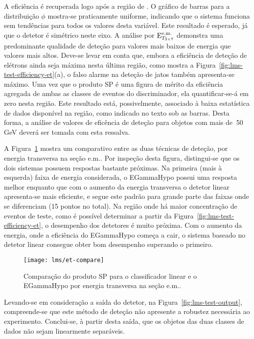 A eficiência é recuperada logo após a região de . O gráfico de
barras para a distribuição $\phi$ mostra-se praticamente uniforme, indicando
que o sistema funciona sem tendências para todos os valores desta
variável. Este resultado é esperado, já que o detetor é simétrico neste
eixo. A análise por $\text{E}^{\text{e.m.}}_{T_{3\times7}}$ demonstra uma predominante qualidade de deteção
para valores mais baixos de energia que valores mais altos. Deve-se levar em
conta que, embora a eficiência de deteção de elétrons ainda seja máxima nesta
última região, como mostra a Figura~\ref{fig:lms-test-efficiency-et}(a), o falso
alarme na deteção de jatos também apresenta-se máximo. Uma vez que o produto
SP é uma figura de mérito da eficiência agregada de ambas as classes de
eventos do discriminador, ela quantificar-se-á em zero nesta região. Este
resultado está, possivelmente, associado à baixa estatística de dados
disponível na região, como indicado no texto sob as barras. Desta forma, a
análise de valores de eficência de deteção para objetos com mais de $~$50 GeV
deverá ser tomada com esta ressalva.

A Figura~\ref{fig:lms-vs-egamma} mostra um comparativo entre as duas técnicas
de deteção, por energia transversa na seção e.m.. Por inspeção desta figura,
distingui-se que os dois sistemas possuem respostas bastante próximas. Na
primeira (mais à esquerda) faixa de energia considerada, o EGammaHypo possui
uma resposta melhor enquanto que com o aumento da energia transversa o detetor
linear apresenta-se mais eficiente, e segue este padrão para grande parte das
faixas onde se diferenciam (15 pontos no total). Na região onde há maior
concentração de eventos de teste, como é possível determinar a partir da
Figura~\ref{fig:lms-test-efficiency-et}, o desempenho dos detetores é muito
próxima. Com o aumento da energia, onde a eficiência do EGammaHypo começa a
cair, o sistema baseado no detetor linear consegue obter bom desempenho
superando o primeiro.

\begin{figure}
\begin{center}
\texttt{[image: lms/et-compare]}
\end{center}
\caption{Comparação do produto SP para o classificador linear e o
EGammaHypo por energia transversa na seção e.m..}
\label{fig:lms-vs-egamma}
\end{figure}

Levando-se em consideração a saída do detetor, na
Figura~\ref{fig:lms-test-output}, compreende-se que este método de deteção não
apresente a robustez necessária ao experimento. Conclui-se, à partir desta
saída, que os objetos das duas classes de dados não sejam linearmente
separáveis.

